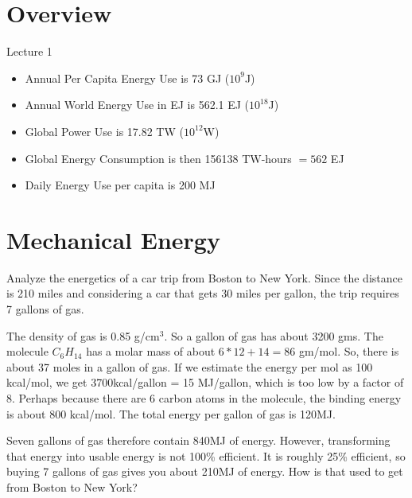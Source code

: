 \documentclass[11pt]{book}
\begin{document}
\newcommand\dirac{\delta_D}
\newcommand{\rf}[1]{\ref{fig:#1}}
\newcommand\example[1]{{\tt EXAMPLE: #1}}
\newcommand\expect[1]{{\tt {\bf Back of the Envelope:} #1}}
\newcommand\theorem[1]{{\tt Theorem: #1}}
\newcommand\bei{\begin{itemize}}
\newcommand\eei{\end{itemize}}
\newcommand\bee{\begin{enumerate}}
\newcommand\eee{\end{enumerate}}
\newcommand\lecture[1]{\newpage
\begin{center}
Lecture #1
\end{center}
}
\newcommand\conversion[1]{\fbox{#1}}

\chapter{Overview}
\lecture{1}

\bei
\item Annual Per Capita Energy Use is 73 GJ ($10^9$J)
\item
Annual World Energy Use in EJ is 562.1 EJ ($10^{18}$J)
\item
Global Power Use is 17.82 TW ($10^{12}$W)
\item 
Global Energy Consumption is then 156138 TW-hours $=562$ EJ
\item
Daily Energy Use per capita is 200 MJ
\eei
\chapter{Mechanical Energy}

Analyze the energetics of a car trip from Boston to New York. Since the distance is 210 miles and considering a car that gets 30 miles per gallon, the trip requires 7 gallons of gas. 

\conversion{1 Gallon = 3.78 Liters = 3780 cm$^3$}

The density of gas is  0.85 g/cm$^3$. So a gallon of gas has about 3200 gms. The molecule $C_6H_{14}$ has a molar mass of about $6*12+14=86$ gm/mol. So, there is about 37 moles in a gallon of gas. If we estimate the energy per mol as 100 kcal/mol, we get 3700kcal/gallon = 15 MJ/gallon, which is too low by a factor of 8. Perhaps because there are 6 carbon atoms in the molecule, the binding energy is about 800 kcal/mol. The total energy per gallon of gas is 120MJ.

Seven gallons of gas therefore contain 840MJ of energy. However, transforming that energy into usable energy is not 100\% efficient. It is roughly 25\% efficient, so buying 7 gallons of gas gives you about 210MJ of energy. How is that used to get from Boston to New York?
\end{document}
